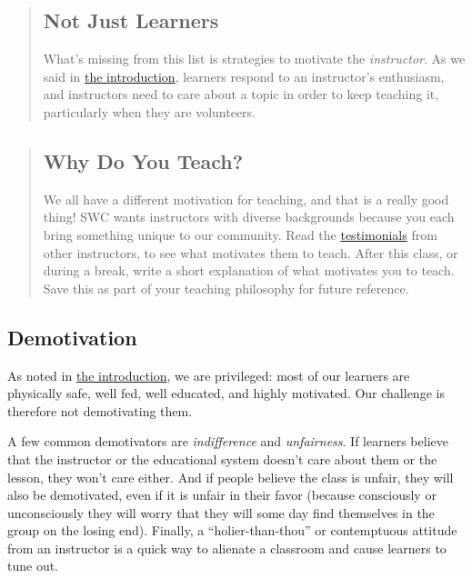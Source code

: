 \begin{quotation}   %
\subsection*{Not Just Learners}

What's missing from this list is strategies to motivate the \emph{instructor}.
As we said in \href{\{\{ page.root \}\}/02-introduction/}{the introduction},
learners respond to an instructor's enthusiasm,
and instructors need to care about a topic in order to keep teaching it,
particularly when they are volunteers.
\end{quotation}   %

\begin{quotation}   %
\subsection*{Why Do You Teach?}

We all have a different motivation for teaching, and that is a really good thing!
SWC wants instructors with diverse backgrounds because you each bring something
unique to our community.  Read
the \href{\{\{ page.root \}\}/guide/\#testimonials}{testimonials} from other instructors,
to see what motivates them to teach.  After this class, or during a break,
write a short explanation of what motivates you to teach. Save this as part of
your teaching philosophy for future reference.
\end{quotation}   %

\subsection*{Demotivation}

As noted in \href{\{\{ page.root \}\}/02-introduction/}{the introduction},
we are privileged:
most of our learners are physically safe, well fed, well educated, and highly motivated.
Our challenge is therefore not demotivating them.

A few common demotivators are \emph{indifference} and \emph{unfairness}.
If learners believe that the instructor or the educational system doesn't care about them or the lesson,
they won't care either.
And if people believe the class is unfair,
they will also be demotivated,
even if it is unfair in their favor
(because consciously or unconsciously they will worry that
they will some day find themselves in the group on the losing end).  Finally,
a ``holier-than-thou'' or contemptuous attitude from an instructor is a quick way
to alienate a classroom and cause learners to tune out.

